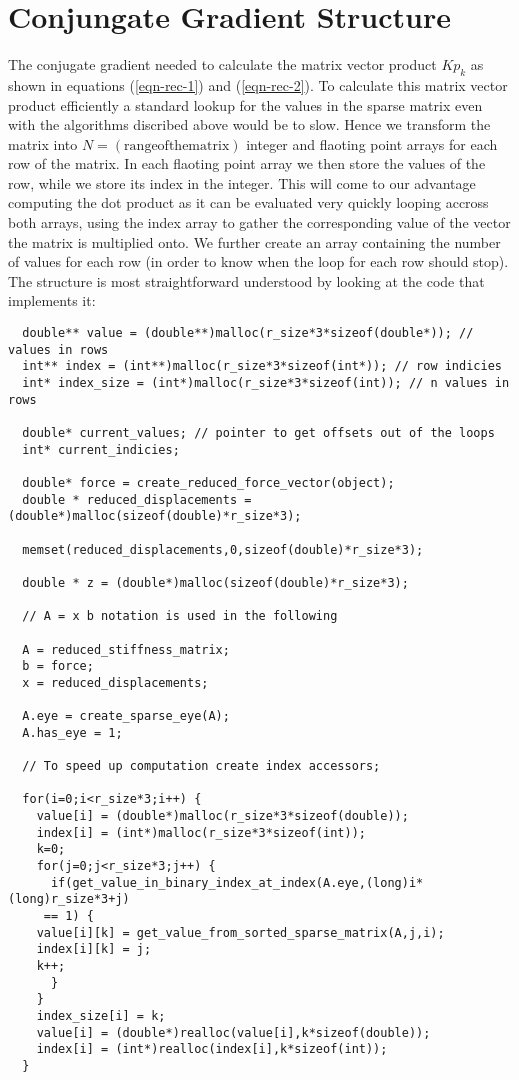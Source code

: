 \section{Conjungate Gradient Structure}
The conjugate gradient needed to calculate the matrix vector product
$Kp_k$ as shown in equations (\ref{eqn-rec-1}) and (\ref{eqn-rec-2}). To
calculate this matrix vector product efficiently a standard lookup 
for the values in the sparse matrix even with the algorithms discribed
above would be to slow. Hence we transform the matrix into $N =
(\mathrm{range of the matrix})$ integer and flaoting point arrays for
each row of the matrix. In each flaoting point array we then store the
values of the row, while we store its index in the integer.
This will come to our advantage computing the dot product as it can be
evaluated very quickly looping accross both arrays, using the index
array to gather the corresponding value of the vector the matrix is
multiplied onto. We further create an array
containing the number of values for each row (in order to know when
the loop for each row should stop). The structure is most
straightforward understood by looking at the code that implements it:
\begin{lstlisting}
  double** value = (double**)malloc(r_size*3*sizeof(double*)); // values in rows
  int** index = (int**)malloc(r_size*3*sizeof(int*)); // row indicies
  int* index_size = (int*)malloc(r_size*3*sizeof(int)); // n values in rows

  double* current_values; // pointer to get offsets out of the loops
  int* current_indicies;
  
  double* force = create_reduced_force_vector(object);
  double * reduced_displacements = (double*)malloc(sizeof(double)*r_size*3);
    
  memset(reduced_displacements,0,sizeof(double)*r_size*3);

  double * z = (double*)malloc(sizeof(double)*r_size*3);
  
  // A = x b notation is used in the following

  A = reduced_stiffness_matrix;
  b = force;
  x = reduced_displacements;

  A.eye = create_sparse_eye(A);
  A.has_eye = 1;
  
  // To speed up computation create index accessors;

  for(i=0;i<r_size*3;i++) {
    value[i] = (double*)malloc(r_size*3*sizeof(double));
    index[i] = (int*)malloc(r_size*3*sizeof(int));
    k=0;
    for(j=0;j<r_size*3;j++) {
      if(get_value_in_binary_index_at_index(A.eye,(long)i*(long)r_size*3+j)
	 == 1) {
	value[i][k] = get_value_from_sorted_sparse_matrix(A,j,i);
	index[i][k] = j;
	k++;
      }
    }
    index_size[i] = k;
    value[i] = (double*)realloc(value[i],k*sizeof(double));
    index[i] = (int*)realloc(index[i],k*sizeof(int));
  }
\end{lstlisting}

